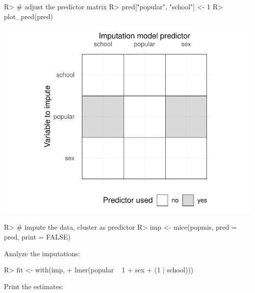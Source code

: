 \documentclass[
]{jss}
\begin{document}
\begin{CodeChunk}
\begin{CodeInput}
R> # adjust the predictor matrix
R> pred["popular", "school"] <- 1 
R> plot_pred(pred)
\end{CodeInput}


\begin{center}\includegraphics{Imputation_of_Incomplete_Multilevel_Data_files/figure-latex/pop_predictor-1} \end{center}

\begin{CodeInput}
R> # impute the data, cluster as predictor
R> imp <- mice(popmis, pred = pred, print = FALSE)
\end{CodeInput}
\end{CodeChunk}

Analyze the imputations:

\begin{CodeChunk}
\begin{CodeInput}
R> fit <- with(imp, 
+             lmer(popular ~ 1 + sex + (1 | school))) 
\end{CodeInput}
\end{CodeChunk}

Print the estimates:
\end{document}

